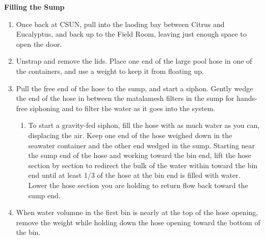 \documentclass[]{book}
\providecommand{\tightlist}{%
  \setlength{\itemsep}{0pt}\setlength{\parskip}{0pt}}
\begin{document}
 \textbf{Filling the Sump}

\begin{enumerate}
\def\labelenumi{\arabic{enumi}.}
\tightlist
\item
  Once back at CSUN, pull into the laoding bay between Citrus and
  Eucalyptus, and back up to the Field Room, leaving just enough space
  to open the door.
\item
  Unstrap and remove the lids. Place one end of the large pool hose in
  one of the containers, and use a weight to keep it from floating up.
\item
  Pull the free end of the hose to the sump, and start a siphon. Gently
  wedge the end of the hose in between the matalamesh filters in the
  sump for hands-free siphoning and to filter the water as it goes into
  the system.

  \begin{enumerate}
  \def\labelenumii{\arabic{enumii}.}
  \tightlist
  \item
    To start a gravity-fed siphon, fill the hose with as much water as
    you can, displacing the air. Keep one end of the hose weighed down
    in the seawater container and the other end wedged in the sump.
    Starting near the sump end of the hose and working toward the bin
    end, lift the hose section by section to redirect the bulk of the
    water within toward the bin end until at least 1/3 of the hose at
    the bin end is filled with water. Lower the hose section you are
    holding to return flow back toward the sump end.
  \end{enumerate}
\item
  When water volumne in the first bin is nearly at the top of the hose
  opening, remove the weight while holding down the hose opening toward
  the bottom of the bin.


\end{enumerate}
\end{document}

